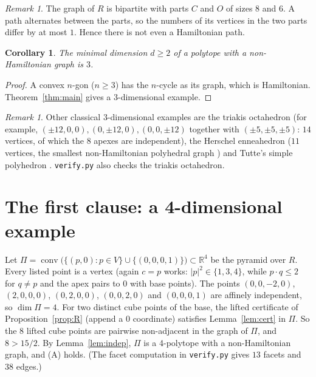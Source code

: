 \documentclass[11pt]{article}
\newtheorem{corollary}[theorem]{Corollary}
\theoremstyle{definition}
\theoremstyle{remark}
\newtheorem{remark}[theorem]{Remark}
\begin{document}
\begin{remark}\label{rem:path}
The graph of $R$ is bipartite with parts $C$ and $O$ of sizes $8$ and $6$. A path
alternates between the parts, so the numbers of its vertices in the two parts
differ by at most $1$. Hence there is not even a Hamiltonian path.
\end{remark}

\begin{corollary}
The minimal dimension $d\ge2$ of a polytope with a non-Hamiltonian graph is $3$.
\end{corollary}
\begin{proof}
A convex $n$-gon ($n\ge3$) has the $n$-cycle as its graph, which is Hamiltonian.
Theorem~\ref{thm:main} gives a 3-dimensional example.
\end{proof}

\begin{remark}
Other classical 3-dimensional examples are the triakis octahedron (for example,
$(\pm12,0,0),(0,\pm12,0),(0,0,\pm12)$ together with $(\pm5,\pm5,\pm5)$: $14$ vertices,
of which the $8$ apexes are independent), the Herschel enneahedron ($11$ vertices,
the smallest non-Hamiltonian polyhedral graph \cite{herschel}) and Tutte's simple
polyhedron \cite{tutte}. \texttt{verify.py} also checks the triakis octahedron.
\end{remark}

\section{The first clause: a 4-dimensional example}
Let $\Pi=\operatorname{conv}\bigl(\{(p,0):p\in V\}\cup\{(0,0,0,1)\}\bigr)\subset\mathbb{R}^4$
be the pyramid over $R$.
Every listed point is a vertex (again $c=p$ works: $|p|^2\in\{1,3,4\}$, while
$p\cdot q\le2$ for $q\neq p$ and the apex pairs to $0$ with base points). The points
$(0,0,-2,0)$, $(2,0,0,0)$, $(0,2,0,0)$, $(0,0,2,0)$ and $(0,0,0,1)$ are affinely independent,
so $\dim\Pi=4$. For two distinct cube points of the base, the lifted certificate of
Proposition~\ref{prop:R} (append a $0$ coordinate) satisfies Lemma~\ref{lem:cert}
in $\Pi$. So the $8$ lifted cube points are pairwise non-adjacent in the graph
of $\Pi$, and $8>15/2$. By Lemma~\ref{lem:indep}, $\Pi$ is a 4-polytope with a
non-Hamiltonian graph, and (A) holds. (The facet computation in \texttt{verify.py}
gives $13$ facets and $38$ edges.)
\end{document}
